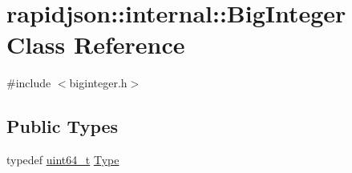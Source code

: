 \hypertarget{classrapidjson_1_1internal_1_1_big_integer}{}\section{rapidjson\+::internal\+::Big\+Integer Class Reference}
\label{classrapidjson_1_1internal_1_1_big_integer}


{\ttfamily \#include $<$biginteger.\+h$>$}

\subsection*{Public Types}
\begin{DoxyCompactItemize}
\item 
typedef \mbox{\hyperlink{stdint_8h_aec6fcb673ff035718c238c8c9d544c47}{uint64\+\_\+t}} \mbox{\hyperlink{classrapidjson_1_1internal_1_1_big_integer_a37d8e8c111f0d76fa07bb4da4790514d}{Type}}
\end{DoxyCompactItemize}
